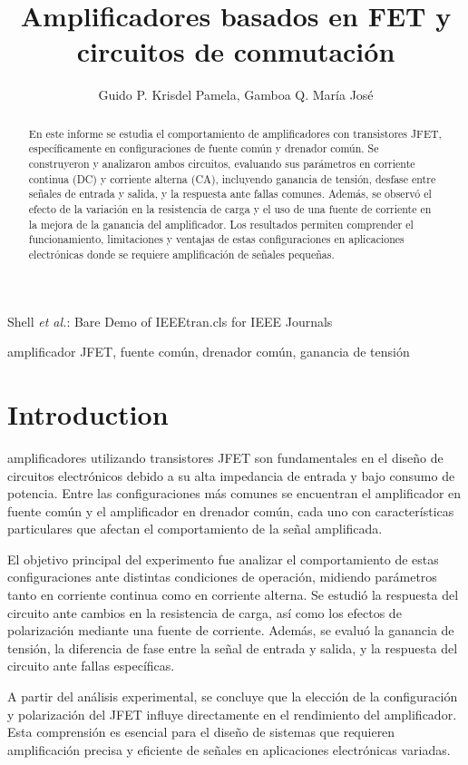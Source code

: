 \documentclass[journal]{IEEEtran}
\begin{document}
	\title{Amplificadores basados en FET y circuitos de conmutación}
	\author{Guido P. Krisdel Pamela, Gamboa Q. María José} 
	{Shell \MakeLowercase{\textit{et al.}}: Bare Demo of IEEEtran.cls for IEEE Journals}
	
	\maketitle
	\renewcommand{\abstractname}{Resumen}
	\begin{abstract}
		En este informe se estudia el comportamiento de amplificadores con transistores JFET, específicamente en configuraciones de fuente común y drenador común. Se construyeron y analizaron ambos circuitos, evaluando sus parámetros en corriente continua (DC) y corriente alterna (CA), incluyendo ganancia de tensión, desfase entre señales de entrada y salida, y la respuesta ante fallas comunes. Además, se observó el efecto de la variación en la resistencia de carga y el uso de una fuente de corriente en la mejora de la ganancia del amplificador. Los resultados permiten comprender el funcionamiento, limitaciones y ventajas de estas configuraciones en aplicaciones electrónicas donde se requiere amplificación de señales pequeñas.
	\end{abstract}
	
	\renewcommand{\IEEEkeywordsname}{Palabras clave}
	\begin{IEEEkeywords}
		amplificador JFET, fuente común, drenador común, ganancia de tensión
	\end{IEEEkeywords}
	
	\IEEEpeerreviewmaketitle
	
	\section{Introduction}
	amplificadores utilizando transistores JFET son fundamentales en el diseño de circuitos electrónicos debido a su alta impedancia de entrada y bajo consumo de potencia. Entre las configuraciones más comunes se encuentran el amplificador en fuente común y el amplificador en drenador común, cada uno con características particulares que afectan el comportamiento de la señal amplificada.
	\par El objetivo principal del experimento fue analizar el comportamiento de estas configuraciones ante distintas condiciones de operación, midiendo parámetros tanto en corriente continua como en corriente alterna. Se estudió la respuesta del circuito ante cambios en la resistencia de carga, así como los efectos de polarización mediante una fuente de corriente. Además, se evaluó la ganancia de tensión, la diferencia de fase entre la señal de entrada y salida, y la respuesta del circuito ante fallas específicas.
	\par A partir del análisis experimental, se concluye que la elección de la configuración y polarización del JFET influye directamente en el rendimiento del amplificador. Esta comprensión es esencial para el diseño de sistemas que requieren amplificación precisa y eficiente de señales en aplicaciones electrónicas variadas.
	
\end{document}
